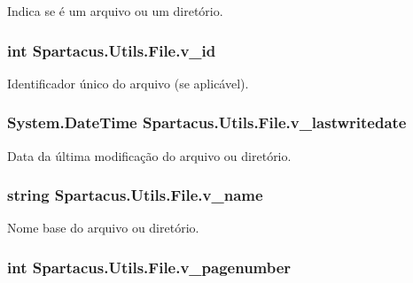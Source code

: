 Indica se é um arquivo ou um diretório. 

\hypertarget{classSpartacus_1_1Utils_1_1File_a17bc6165cc938a4f490025290945a6e3}{
\subsubsection[{v\+\_\+id}]{\setlength{\rightskip}{0pt plus 5cm}int Spartacus.\+Utils.\+File.\+v\+\_\+id}}\label{classSpartacus_1_1Utils_1_1File_a17bc6165cc938a4f490025290945a6e3}


Identificador único do arquivo (se aplicável). 

\hypertarget{classSpartacus_1_1Utils_1_1File_a3ff14b7ecbf2e2b5bb41f44943a18c83}{
\subsubsection[{v\+\_\+lastwritedate}]{\setlength{\rightskip}{0pt plus 5cm}System.\+Date\+Time Spartacus.\+Utils.\+File.\+v\+\_\+lastwritedate}}\label{classSpartacus_1_1Utils_1_1File_a3ff14b7ecbf2e2b5bb41f44943a18c83}


Data da última modificação do arquivo ou diretório. 

\hypertarget{classSpartacus_1_1Utils_1_1File_a080b095e2b7aa8e1e6afaeff1ab8f453}{
\subsubsection[{v\+\_\+name}]{\setlength{\rightskip}{0pt plus 5cm}string Spartacus.\+Utils.\+File.\+v\+\_\+name}}\label{classSpartacus_1_1Utils_1_1File_a080b095e2b7aa8e1e6afaeff1ab8f453}


Nome base do arquivo ou diretório. 

\hypertarget{classSpartacus_1_1Utils_1_1File_a02b1d6f67f6718b43807e120244fcf4f}{
\subsubsection[{v\+\_\+pagenumber}]{\setlength{\rightskip}{0pt plus 5cm}int Spartacus.\+Utils.\+File.\+v\+\_\+pagenumber}}\label{classSpartacus_1_1Utils_1_1File_a02b1d6f67f6718b43807e120244fcf4f}


